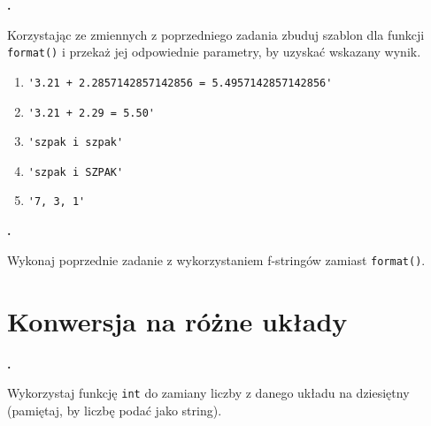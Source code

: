 \documentclass[a4paper]{article}
\begin{document}
\textbf{.}\addtocounter{zadanie}{1} Korzystając ze zmiennych z poprzedniego zadania zbuduj szablon dla funkcji \verb|format()| i przekaż jej odpowiednie parametry, by uzyskać wskazany wynik.

\begin{enumerate}[label=\arabic*.]
    \item \verb|'3.21 + 2.2857142857142856 = 5.4957142857142856'|
    \item \verb|'3.21 + 2.29 = 5.50'|
    \item \verb|'szpak i szpak'|
    \item \verb|'szpak i SZPAK'|
    \item \verb|'7, 3, 1'|

\end{enumerate}

\textbf{.}\addtocounter{zadanie}{1} Wykonaj poprzednie zadanie z wykorzystaniem f-stringów zamiast \verb|format()|.

\section{Konwersja na różne układy}

\textbf{.}\addtocounter{zadanie}{1} Wykorzystaj funkcję \verb|int| do zamiany liczby z danego układu na dziesiętny (pamiętaj, by liczbę podać jako string).
\end{document}
